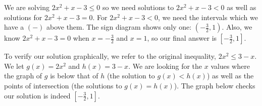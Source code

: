 \documentclass{ximera}
\begin{document}
\begin{example}
\begin{explanation}
\begin{enumerate}
\begin{center}
\begin{image}
\end{image}
\end{center}




We are solving $2x^2+x-3 \leq 0$ so we need solutions to $2x^2+x-3 < 0$ as well as solutions for $2x^2+x-3 =0$.  For $2x^2+x-3 < 0$, we need the intervals which we have a $(-)$ above them.  The sign diagram shows only one: $\left(-\frac{3}{2},1\right)$.  Also, we know $2x^2+x-3 =0$ when $x=-\frac{3}{2}$ and $x=1$, so our final answer is $\left[-\frac{3}{2},1\right]$.  

\medskip

To verify our solution graphically, we refer to the original inequality, $2x^2 \leq 3-x$.  We let $g(x) = 2x^2$ and $h(x)=3-x$.  We are looking for the $x$ values where the graph of $g$ is below that of $h$ (the solution to $g(x) < h(x)$) as well as the points of intersection (the solutions to $g(x)=h(x)$). The graph below checks our solution is indeed $\left[-\frac{3}{2},1\right]$. 



\end{enumerate}
\end{explanation}
\end{example}
\end{document}
